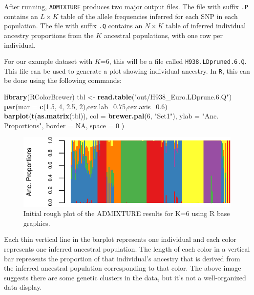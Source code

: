 \documentclass[smallextended]{svjour3}       %
\newenvironment{Shaded}{\begin{snugshade}}{\end{snugshade}}
\newcommand{\KeywordTok}[1]{\textcolor[rgb]{0.13,0.29,0.53}{\textbf{#1}}}
\newcommand{\DataTypeTok}[1]{\textcolor[rgb]{0.13,0.29,0.53}{#1}}
\newcommand{\DecValTok}[1]{\textcolor[rgb]{0.00,0.00,0.81}{#1}}
\newcommand{\FloatTok}[1]{\textcolor[rgb]{0.00,0.00,0.81}{#1}}
\newcommand{\StringTok}[1]{\textcolor[rgb]{0.31,0.60,0.02}{#1}}
\newcommand{\OtherTok}[1]{\textcolor[rgb]{0.56,0.35,0.01}{#1}}
\newcommand{\NormalTok}[1]{#1}
\begin{document}
After running, \texttt{ADMIXTURE} produces two major output files. The
file with suffix \texttt{.P} contains an \(L \times K\) table of the
allele frequencies inferred for each SNP in each population. The file
with suffix \texttt{.Q} contains an \(N \times K\) table of inferred
individual ancestry proportions from the \(K\) ancestral populations,
with one row per individual.

For our example dataset with \(K\)=6, this will be a file called
\texttt{H938.LDpruned.6.Q}. This file can be used to generate a plot
showing individual ancestry. In \texttt{R}, this can be done using the
following commands:

\begin{Shaded}
\begin{Highlighting}[]
\KeywordTok{library}\NormalTok{(RColorBrewer)}
\NormalTok{tbl <-}\StringTok{ }\KeywordTok{read.table}\NormalTok{(}\StringTok{"out/H938_Euro.LDprune.6.Q"}\NormalTok{)}
\KeywordTok{par}\NormalTok{(}\DataTypeTok{mar =} \KeywordTok{c}\NormalTok{(}\FloatTok{1.5}\NormalTok{, }\DecValTok{4}\NormalTok{, }\FloatTok{2.5}\NormalTok{, }\DecValTok{2}\NormalTok{),}\DataTypeTok{cex.lab=}\FloatTok{0.75}\NormalTok{,}\DataTypeTok{cex.axis=}\FloatTok{0.6}\NormalTok{)}
\KeywordTok{barplot}\NormalTok{(}\KeywordTok{t}\NormalTok{(}\KeywordTok{as.matrix}\NormalTok{(tbl)),}
  \DataTypeTok{col =} \KeywordTok{brewer.pal}\NormalTok{(}\DecValTok{6}\NormalTok{, }\StringTok{"Set1"}\NormalTok{), }\DataTypeTok{ylab =} \StringTok{"Anc. Proportions"}\NormalTok{,}
  \DataTypeTok{border =} \OtherTok{NA}\NormalTok{, }\DataTypeTok{space =} \DecValTok{0}
\NormalTok{)}
\end{Highlighting}
\end{Shaded}

\begin{figure}
\centering
\includegraphics{plot/unnamed-chunk-4-1.pdf}
\caption{Initial rough plot of the ADMIXTURE results for K=6 using R
base graphics.}
\end{figure}

Each thin vertical line in the barplot represents one individual and
each color represents one inferred ancestral population. The length of
each color in a vertical bar represents the proportion of that
individual's ancestry that is derived from the inferred ancestral
population corresponding to that color. The above image suggests there
are some genetic clusters in the data, but it's not a well-organized
data display.
\end{document}
